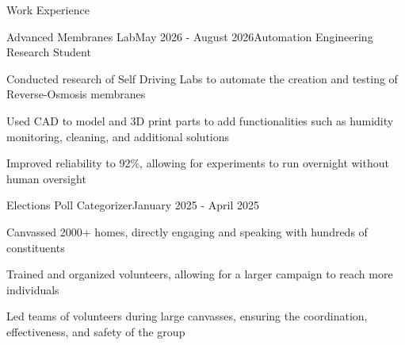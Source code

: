 \documentclass{resume}
\begin{document}
\begin{rSection}{Work Experience}

\begin{rSubsection}{Advanced Membranes Lab}{May 2026 - August 2026}{Automation Engineering Research Student}{}
\item Conducted research of Self Driving Labs to automate the creation and testing of Reverse-Osmosis membranes
\item Used CAD to model and 3D print parts to add functionalities such as humidity monitoring, cleaning, and additional solutions
\item Improved reliability to 92\%, allowing for experiments to run overnight without human oversight
\end{rSubsection}


\begin{rSubsection}{Elections Poll Categorizer}{January 2025 - April 2025}{}{}
\item Canvassed 2000+ homes, directly engaging and speaking with hundreds of constituents
\item Trained and organized volunteers, allowing for a larger campaign to reach more individuals
\item Led teams of volunteers during large canvasses, ensuring the coordination, effectiveness, and safety of the group
\end{rSubsection}

\end{rSection}

\end{document}

